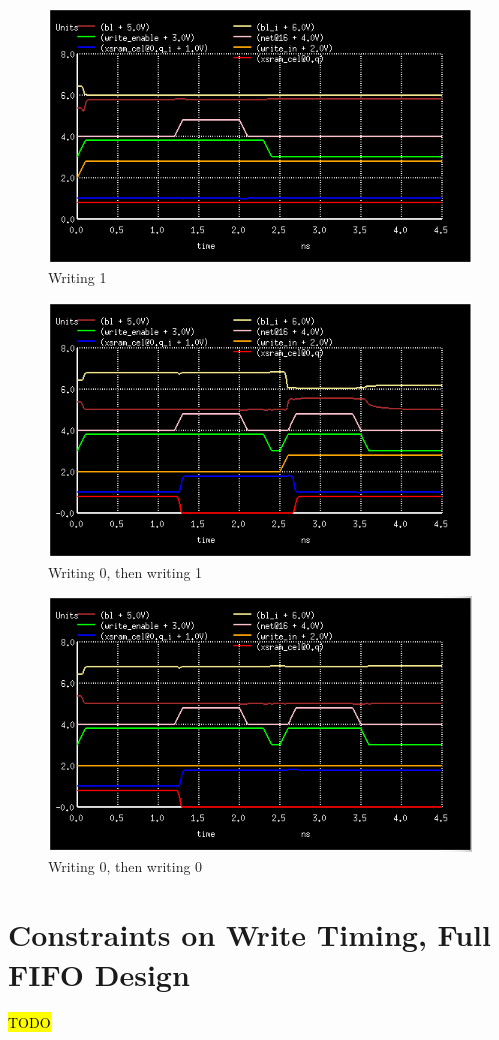\documentclass[12pt]{report}
\begin{document}
\begin{figure}[H]
  \centering
    \includegraphics[width=1.0\textwidth]{write_1_then_write_1.png}
  \caption{Writing 1}
  \label{fig:write_1_then_write_1}
\end{figure}

\begin{figure}[H]
  \centering
    \includegraphics[width=1.0\textwidth]{write_0_then_write_1.png}
  \caption{Writing 0, then writing 1}
  \label{fig:write_0_then_write_1}
\end{figure}

\begin{figure}[H]
  \centering
    \includegraphics[width=1.0\textwidth]{write_0_then_write_0.png}
  \caption{Writing 0, then writing 0}
  \label{fig:write_0_then_write_0}
\end{figure}

\section*{Constraints on Write Timing, Full FIFO Design}
\hl{TODO}
\end{document}
